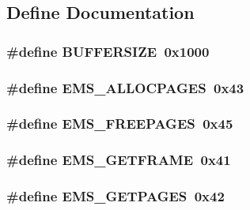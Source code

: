 \subsection{Define Documentation}
\hypertarget{ID__MM_8H_ac3146f1e9227301bb4aa518f4d336cee}{
\subsubsection[{BUFFERSIZE}]{\setlength{\rightskip}{0pt plus 5cm}\#define BUFFERSIZE~0x1000}}
\label{ID__MM_8H_ac3146f1e9227301bb4aa518f4d336cee}
\hypertarget{ID__MM_8H_a4852ea6a018ce47dad32b40fa23afbba}{
\subsubsection[{EMS\_\-ALLOCPAGES}]{\setlength{\rightskip}{0pt plus 5cm}\#define EMS\_\-ALLOCPAGES~0x43}}
\label{ID__MM_8H_a4852ea6a018ce47dad32b40fa23afbba}
\hypertarget{ID__MM_8H_a5496ceab7bc880d5031619abc2e0acd6}{
\subsubsection[{EMS\_\-FREEPAGES}]{\setlength{\rightskip}{0pt plus 5cm}\#define EMS\_\-FREEPAGES~0x45}}
\label{ID__MM_8H_a5496ceab7bc880d5031619abc2e0acd6}
\hypertarget{ID__MM_8H_ae587fb5995f365cfbdec7d991c77c944}{
\subsubsection[{EMS\_\-GETFRAME}]{\setlength{\rightskip}{0pt plus 5cm}\#define EMS\_\-GETFRAME~0x41}}
\label{ID__MM_8H_ae587fb5995f365cfbdec7d991c77c944}
\hypertarget{ID__MM_8H_adffbff7cd41dc46f3c0b8a78392cea43}{
\subsubsection[{EMS\_\-GETPAGES}]{\setlength{\rightskip}{0pt plus 5cm}\#define EMS\_\-GETPAGES~0x42}}
